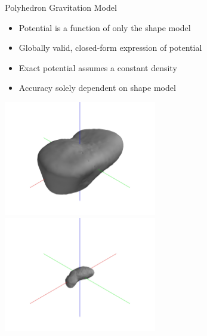 \documentclass[11pt,professionalfonts]{beamer}
\begin{document}
\begin{frame}{Polyhedron Gravitation Model}

\begin{itemize}
    \item Potential is a function of only the shape model
    \item Globally valid, closed-form expression of potential
    \item Exact potential assumes a constant density 
    \item Accuracy solely dependent on shape model
\end{itemize}
\vspace*{-0.6cm}
\begin{center}
    \includegraphics[width=0.5\textwidth,keepaspectratio]{figures/castalia/partial_2047.jpg}~
    \includegraphics[width=0.5\textwidth,keepaspectratio]{figures/itokawa/partial_25349.jpg}
\end{center}
\end{frame}
\end{document}
